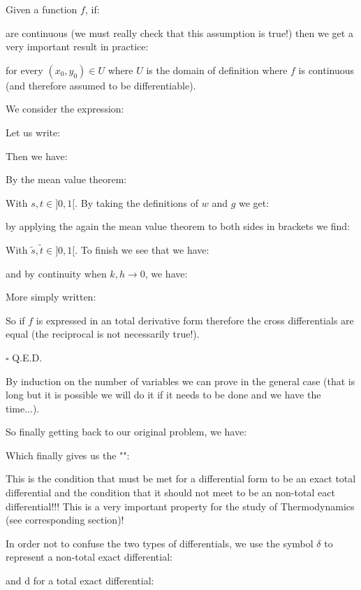 	\begin{theorem}
	Given a function $f$, if:
	
	are continuous (we must really check that this assumption is true!) then we get a very important result in practice:
	
	for every $(x_0,y_0)\in U$ where $U$ is the domain of definition where $f$ is continuous (and therefore assumed to be differentiable).
	\end{theorem}
	\begin{dem}
	We consider the expression:
	
	Let us write:
	
	Then we have:
	
	By the mean value theorem:
	
	With $s,t \in ]0,1[$. By taking the definitions of $w$ and $g$ we get:
	
	by applying the again the mean value theorem to both sides in brackets we find:
	
	With $\tilde{s},\tilde{t} \in ]0,1[$. To finish we see that we have:
	
	and by continuity when $k,h\rightarrow 0$, we have:
	
	More simply written:
	
	So if $f$ is expressed in an total derivative  form therefore the cross differentials are equal (the reciprocal is not necessarily true!).
	\begin{flushright}
		$\square$  Q.E.D.
	\end{flushright}
	\end{dem}
	By induction on the number of variables we can prove in the general case (that is long but it is possible we will do it if it needs to be done and we have the time...).
	
	So finally getting back to our original problem, we have:
	
	Which finally gives us the "":
	
	This is the condition that must be met for a differential form to be an exact total differential and the condition that it should not meet to be an non-total eact differential!!! This is a very important property for the study of Thermodynamics (see corresponding section)!
	
	In order not to confuse the two types of differentials, we use the symbol $\delta$ to represent a non-total exact differential:
	
	and $\mathrm{d}$ for a total exact differential:
	
